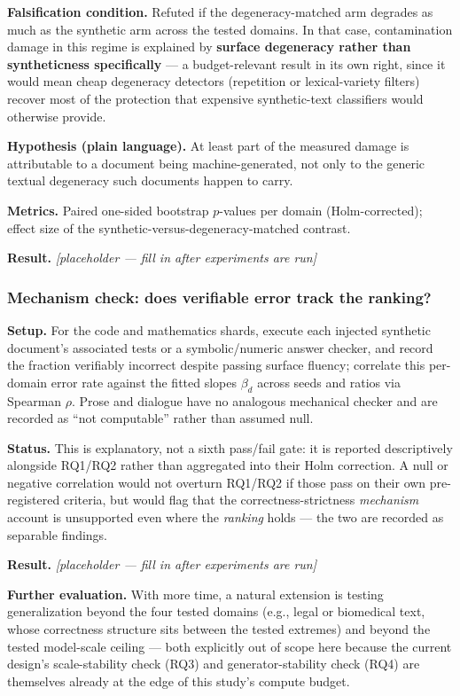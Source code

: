 \documentclass[11pt]{article}
\newcommand{\ph}{\textit{[placeholder --- fill in after experiments are run]}}
\begin{document}
\textbf{Falsification condition.} Refuted if the degeneracy-matched arm degrades as much as the synthetic arm across the tested domains. In that case, contamination damage in this regime is explained by \textbf{surface degeneracy rather than syntheticness specifically} --- a budget-relevant result in its own right, since it would mean cheap degeneracy detectors (repetition or lexical-variety filters) recover most of the protection that expensive synthetic-text classifiers would otherwise provide.

\textbf{Hypothesis (plain language).} At least part of the measured damage is attributable to a document being machine-generated, not only to the generic textual degeneracy such documents happen to carry.

\textbf{Metrics.} Paired one-sided bootstrap $p$-values per domain (Holm-corrected); effect size of the synthetic-versus-degeneracy-matched contrast.

\textbf{Result.} \ph

\subsubsection{Mechanism check: does verifiable error track the ranking?}
\textbf{Setup.} For the code and mathematics shards, execute each injected synthetic document's associated tests or a symbolic/numeric answer checker, and record the fraction verifiably incorrect despite passing surface fluency; correlate this per-domain error rate against the fitted slopes $\beta_d$ across seeds and ratios via Spearman $\rho$. Prose and dialogue have no analogous mechanical checker and are recorded as ``not computable'' rather than assumed null.

\textbf{Status.} This is explanatory, not a sixth pass/fail gate: it is reported descriptively alongside RQ1/RQ2 rather than aggregated into their Holm correction. A null or negative correlation would not overturn RQ1/RQ2 if those pass on their own pre-registered criteria, but would flag that the correctness-strictness \emph{mechanism} account is unsupported even where the \emph{ranking} holds --- the two are recorded as separable findings.

\textbf{Result.} \ph

\vspace{0.5em}
\noindent\textbf{Further evaluation.} With more time, a natural extension is testing generalization beyond the four tested domains (e.g., legal or biomedical text, whose correctness structure sits between the tested extremes) and beyond the tested model-scale ceiling --- both explicitly out of scope here because the current design's scale-stability check (RQ3) and generator-stability check (RQ4) are themselves already at the edge of this study's compute budget.
\end{document}
